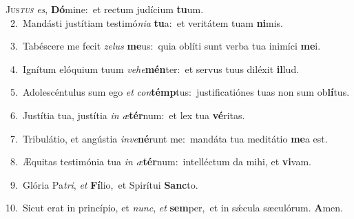 \lettrine{\initial\textcolor{\initialcolor}{J}}{us\-\textit{tus}\-} \textit{es}\-, \textbf{Dó}\-mine:~\star et rectum judícium \textbf{tu}\-um.\\
{\numbfont\textcolor{\numbcolor}{~2.}}~Mandásti justítiam testimó\-\textit{ni}\-\textit{a} \textbf{tu}\-a:~\star et veritátem tuam \textbf{ni}\-mis.\par
{\numbfont\textcolor{\numbcolor}{~3.}}~Tabéscere me fecit \textit{ze}\-\textit{lus} \textbf{me}\-us:~\star quia oblíti sunt verba tua inimíci \textbf{me}\-i.\par
{\numbfont\textcolor{\numbcolor}{~4.}}~Ignítum elóquium tuum \textit{ve}\-\textit{he}\textbf{mén}ter:~\star et servus tuus diléxit \textbf{il}\-lud.\par
{\numbfont\textcolor{\numbcolor}{~5.}}~Adolescéntulus sum ego \textit{et} \textit{con}\-\textbf{témp}tus:~\star justificatiónes tuas non sum ob\-\textbf{lí}\-tus.\par
{\numbfont\textcolor{\numbcolor}{~6.}}~Justítia tua, justítia \textit{in} \textit{æ}\-\textbf{tér}num:~\star et lex tua \textbf{vé}\-ritas.\par
{\numbfont\textcolor{\numbcolor}{~7.}}~Tribulátio, et angústia \textit{in}\-\textit{ve}\textbf{né}runt me:~\star mandáta tua meditátio \textbf{me}\-a est.\par
{\numbfont\textcolor{\numbcolor}{~8.}}~Æquitas testimónia tua \textit{in} \textit{æ}\-\textbf{tér}num:~\star intelléctum da mihi, et \textbf{vi}\-vam.\par
{\numbfont\textcolor{\numbcolor}{~9.}}~Glória Pa\-\textit{tri}\-, \textit{et} \textbf{Fí}\-lio,~\star et Spirítui \textbf{Sanc}\-to.\par
{\numbfont\textcolor{\numbcolor}{10.}}~Sicut erat in princípio, et \textit{nunc}\-, \textit{et} \textbf{sem}\-per,~\star et in sǽcula sæculórum. \textbf{A}\-men.\par
